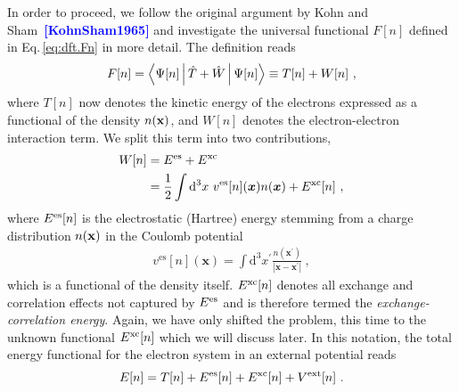 \documentclass[a4paper,12pt]{book}
\newcommand{\CITE}[1]{\textcolor{blue}{{\bf [#1]}}}
\begin{document}
In order to proceed, we follow the original argument by Kohn and Sham~\CITE{KohnSham1965} and investigate the universal functional $F[n]$ defined in Eq.\,\eqref{eq:dft.Fn} in more detail. The definition reads
\begin{align}
	F[n] 
		= \Braket{\Psi [n] | \hat T + \hat W | \Psi [n]}
		\equiv T[n] + W[n]~,
	\label{eq:dft.Fn.2}
\end{align}
where $T[n]$ now denotes the kinetic energy of the electrons expressed as a functional of the density $n ({\bf x})$, and $W[n]$ denotes the electron-electron interaction term. We split this term into two contributions,
\begin{align}
	\begin{split}
	W[n] 
		&= E^{\rm es} + E^{\rm xc} \\
		&= \frac{1}{2} \int \mathrm{d}^{3} x ~ 
			v^{\mathrm{es}}[n](\boldsymbol{x}) n(\boldsymbol{x})+E^{\mathrm{xc}}[n]~,
	\end{split}
	\label{eq:dft.KS.W}
\end{align}
where $E^{\rm es} [n]$ is the electrostatic (Hartree) energy stemming from a charge distribution $n ({\bf x})$ in the Coulomb potential
\begin{align}
	v^{\mathrm{es}}[n](\boldsymbol{x})
		= \int \mathrm{d}^{3} x^{\prime} \frac{n\left(\boldsymbol{x}^{\prime}\right)}{\left|\boldsymbol{x}-\boldsymbol{x}^{\prime}\right|}~,
	\label{eq:dft.KS.ves}
\end{align}
which is a functional of the density itself. $E^{\rm xc} [n]$ denotes all exchange and correlation effects not captured by $E^{\rm es}$ and is therefore termed the \emph{exchange-correlation energy}. Again, we have only shifted the problem, this time to the unknown functional $E^{\rm xc} [n]$ which we will discuss later.
In this notation, the total energy functional for the electron system in an external potential reads
\begin{align}
	E[n]
		= T[n] +  E^{\rm es}[n] + E^{\rm xc} [n] + V^{\rm ext}[n]~.
	\label{eq:dft.Ks.En}
\end{align}
\end{document}
